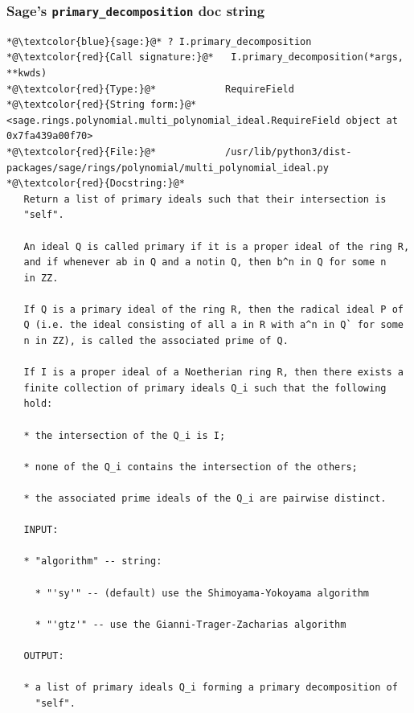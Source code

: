 \documentclass{beamer}
\begin{document}
\begin{frame}[fragile]
\frametitle{Sage's {\tt primary_decomposition} doc string}
\tiny
\begin{adjustbox}{raise=10pt}
\begin{minipage}{\linewidth}
\begin{lstlisting}
*@\textcolor{blue}{sage:}@* ? I.primary_decomposition
*@\textcolor{red}{Call signature:}@*   I.primary_decomposition(*args, **kwds)
*@\textcolor{red}{Type:}@*            RequireField
*@\textcolor{red}{String form:}@*     <sage.rings.polynomial.multi_polynomial_ideal.RequireField object at 0x7fa439a00f70>
*@\textcolor{red}{File:}@*            /usr/lib/python3/dist-packages/sage/rings/polynomial/multi_polynomial_ideal.py
*@\textcolor{red}{Docstring:}@*
   Return a list of primary ideals such that their intersection is
   "self".

   An ideal Q is called primary if it is a proper ideal of the ring R,
   and if whenever ab in Q and a notin Q, then b^n in Q for some n
   in ZZ.

   If Q is a primary ideal of the ring R, then the radical ideal P of
   Q (i.e. the ideal consisting of all a in R with a^n in Q` for some
   n in ZZ), is called the associated prime of Q.

   If I is a proper ideal of a Noetherian ring R, then there exists a
   finite collection of primary ideals Q_i such that the following
   hold:

   * the intersection of the Q_i is I;

   * none of the Q_i contains the intersection of the others;

   * the associated prime ideals of the Q_i are pairwise distinct.

   INPUT:

   * "algorithm" -- string:

     * "'sy'" -- (default) use the Shimoyama-Yokoyama algorithm

     * "'gtz'" -- use the Gianni-Trager-Zacharias algorithm

   OUTPUT:

   * a list of primary ideals Q_i forming a primary decomposition of
     "self".


\end{lstlisting}
\end{minipage}
\end{adjustbox}
\end{frame}
\end{document}
